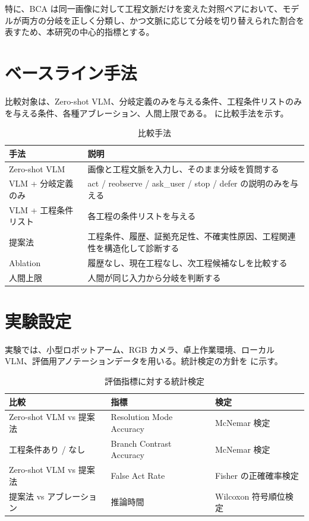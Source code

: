 特に、BCA は同一画像に対して工程文脈だけを変えた対照ペアにおいて、モデルが両方の分岐を正しく分類し、かつ文脈に応じて分岐を切り替えられた割合を表すため、本研究の中心的指標とする。

\section{ベースライン手法}

比較対象は、Zero-shot VLM、分岐定義のみを与える条件、工程条件リストのみを与える条件、各種アブレーション、人間上限である。 に比較手法を示す。

\begin{table}[tbp]
\centering
\caption{比較手法}
\label{tab:baseline}
\begin{tabularx}{\linewidth}{lX}
\toprule
手法 & 説明 \\
\midrule
Zero-shot VLM & 画像と工程文脈を入力し、そのまま分岐を質問する \\
VLM + 分岐定義のみ & act / reobserve / ask\_user / stop / defer の説明のみを与える \\
VLM + 工程条件リスト & 各工程の条件リストを与える \\
提案法 & 工程条件、履歴、証拠充足性、不確実性原因、工程関連性を構造化して診断する \\
Ablation & 履歴なし、現在工程なし、次工程候補なしを比較する \\
人間上限 & 人間が同じ入力から分岐を判断する \\
\bottomrule
\end{tabularx}
\end{table}

\section{実験設定}

実験では、小型ロボットアーム、RGB カメラ、卓上作業環境、ローカル VLM、評価用アノテーションデータを用いる。統計検定の方針を  に示す。

\begin{table}[tbp]
\centering
\caption{評価指標に対する統計検定}
\label{tab:stats}
\begin{tabularx}{\linewidth}{lXl}
\toprule
比較 & 指標 & 検定 \\
\midrule
Zero-shot VLM vs 提案法 & Resolution Mode Accuracy & McNemar 検定 \\
工程条件あり / なし & Branch Contrast Accuracy & McNemar 検定 \\
Zero-shot VLM vs 提案法 & False Act Rate & Fisher の正確確率検定 \\
提案法 vs アブレーション & 推論時間 & Wilcoxon 符号順位検定 \\
\bottomrule
\end{tabularx}
\end{table}

